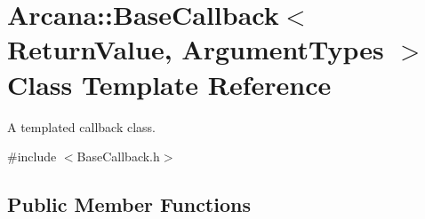 \hypertarget{class_arcana_1_1_base_callback}{}\section{Arcana\+:\+:Base\+Callback$<$ Return\+Value, Argument\+Types $>$ Class Template Reference}
\label{class_arcana_1_1_base_callback}


A templated callback class.  




{\ttfamily \#include $<$Base\+Callback.\+h$>$}

\subsection*{Public Member Functions}
